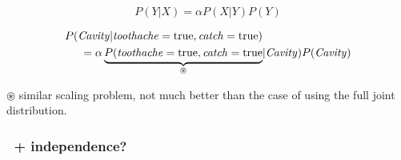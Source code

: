 \begin{frame}\frametitle{\subsecname}

\begin{equation}
P(Y|X) = \alpha P(X|Y)P(Y)
\end{equation}

\begin{align}
P(\mathit{Cavity}|\mathit{toothache}=\text{true}, \mathit{catch}=\text{true}) &\\ 
=\alpha \underbrace{P(\mathit{toothache}=\text{true}, \mathit{catch}=\text{true}}_{\circledast} &| \mathit{Cavity})P(\mathit{Cavity})
\label{eq:applybayes}
\end{align}

$\circledast$ similar scaling problem, not much better than the case of using the full joint distribution.

\end{frame}

\begin{frame}\frametitle{\subsecname~+ independence?}

\svspace{-10mm}




\end{frame}

